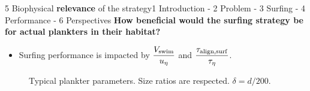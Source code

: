 \begin{frame}{5 Biophysical \textbf{relevance} of the strategy}{1 Introduction - 2 Problem - 3 Surfing - 4 Performance - 6 Perspectives}
	\centering
	\vspace{5pt}
	\textbf{\large How beneficial would the surfing strategy be \\ for actual plankters in their habitat?}

	\pause
	\vspace{10pt}
	\begin{itemize}
		\item Surfing performance is impacted by $\displaystyle \frac{V_{\mathrm{swim}}}{u_{\eta}}$ and $\displaystyle \frac{\tau_{\mathrm{align, surf}}}{\tau_{\eta}}$.
	\end{itemize}

	\pause
	\vspace{5pt}
	\begin{figure}
		\caption{
			Typical plankter parameters. Size ratios are respected. $\delta = d /200$.
		}
	\end{figure}
\end{frame}


